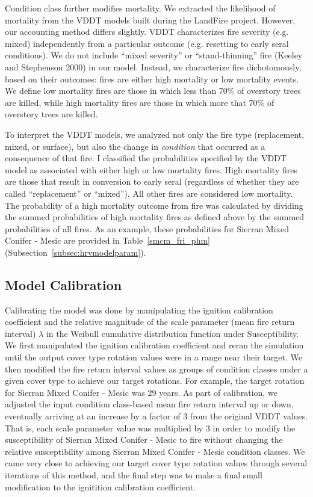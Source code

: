\begin{itemize}
Condition class further modifies mortality. We extracted the likelihood of mortality from the VDDT models built during the LandFire project. However, our accounting method differs slightly. VDDT characterizes fire severity (e.g. mixed) independently from a particular outcome (e.g. resetting to early seral conditions). We do not include ``mixed severity'' or ``stand-thinning'' fire (Keeley and Stephenson 2000) in our model. Instead, we characterize fire dichotomously, based on their outcomes: fires are either high mortality or low mortality events. We define low mortality fires are those in which less than 70\% of overstory trees are killed, while high mortality fires are those in which more that 70\% of overstory trees are killed. 

To interpret the VDDT models, we analyzed not only the fire type (replacement, mixed, or surface), but also the change in \emph{condition} that occurred as a consequence of that fire. I classified the probabilities specified by the VDDT model as associated with either high or low mortality fires. High mortality fires are those that result in conversion to early seral (regardless of whether they are called ``replacement'' or ``mixed''). All other fires are considered low mortality. The probability of a high mortality outcome from fire was calculated by dividing the summed probabilities of high mortality fires as defined above by the summed probabilities of all fires. As an example, these probabilities for Sierran Mixed Conifer - Mesic are provided in Table~\ref{smcm_fri_phm} (Subsection~\ref{subsec:hrvmodelparam}).

\end{itemize}

\subsection{Model Calibration}
Calibrating the model was done by manipulating the ignition calibration coefficient and the relative magnitude of the scale parameter (mean fire return interval) $\lambda$ in the Weibull cumulative distribution function under Susceptibility. We first manipulated the ignition calibration coefficient and reran the simulation until the output cover type rotation values were in a range near their target. We then modified the fire return interval values as groups of condition classes under a given cover type to achieve our target rotations. For example, the target rotation for Sierran Mixed Conifer - Mesic was 29 years. As part of calibration, we adjusted the input condition class-based mean fire return interval up or down, eventually arriving at an increase by a factor of 3 from the original VDDT values. That is, each scale parameter value was multiplied by 3 in order to modify the susceptibility of Sierran Mixed Conifer - Mesic to fire without changing the relative susceptibility among Sierran Mixed Conifer - Mesic condition classes. We came very close to achieving our target cover type rotation values through several iterations of this method, and the final step was to make a final small modification to the ignitition calibration coefficient.

